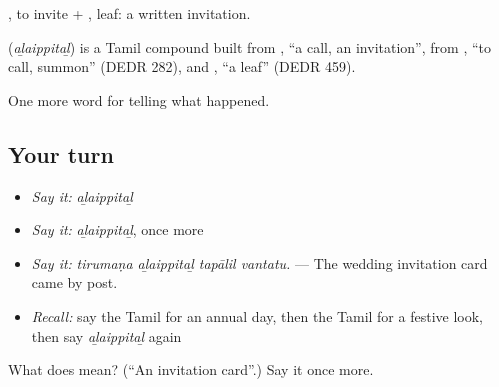 , to invite + , leaf: a written invitation.

\begin{cousinweb}
\textbf{} (\emph{aḻaippitaḻ}) is a Tamil compound built from , \textquotedblleft{}a call, an invitation\textquotedblright{}, from , \textquotedblleft{}to call, summon\textquotedblright{} (DEDR 282), and , \textquotedblleft{}a leaf\textquotedblright{} (DEDR 459).
\end{cousinweb}

\begin{grammarlens}[title={What you've built}]
One more word for telling what happened.
\end{grammarlens}

\subsection*{Your turn}
\begin{itemize}
\raggedright
  \item \emph{Say it:} \emph{aḻaippitaḻ}
  \item \emph{Say it:} \emph{aḻaippitaḻ}, once more
  \item \emph{Say it:} \emph{tirumaṇa aḻaippitaḻ tapālil vantatu.} — The wedding invitation card came by post.
  \item \emph{Recall:} say the Tamil for an annual day, then the Tamil for a festive look, then say \emph{aḻaippitaḻ} again
\end{itemize}

\begin{tcolorbox}[breakable,colback=teal!4,colframe=teal!35!black,title={Before you move on}]
What does  mean? (\textquotedblleft{}An invitation card\textquotedblright{}.) Say it once more.
\end{tcolorbox}
